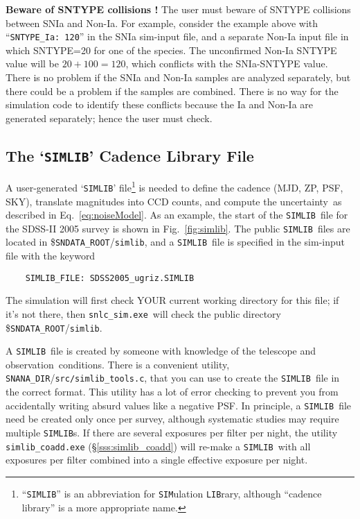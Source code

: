 \documentclass[12pt]{article}
\newcommand{\unc}{uncertainty}
\newcommand{\simexe}{{\tt snlc\_sim.exe}}
\newcommand{\snanadir}{{\tt SNANA\_DIR}}
\newcommand{\sndataroot}{{\tt SNDATA\_ROOT}}
\newcommand{\simlib}{{\tt SIMLIB}}
\newcommand{\obs}{observation}
\begin{document}
{\bigskip
{\bf Beware of SNTYPE collisions !}
The user must beware of SNTYPE collisions between SNIa and Non-Ia.
For example, consider the example above with 
``{\tt SNTYPE\_Ia: 120}'' in the SNIa sim-input file,
and a separate Non-Ia input file in which SNTYPE=20
for one of the species. The unconfirmed Non-Ia SNTYPE
value will be $20+100 = 120$, which conflicts with the
SNIa-SNTYPE value. There is no problem if the SNIa and
Non-Ia samples are analyzed separately, but there could
be a problem if the samples are combined. There is no
way for the simulation code to identify these conflicts because
the Ia and Non-Ia are generated separately; hence the
user must check.


  \clearpage
  \subsection{The `{\simlib}' Cadence Library File }
  \label{subsec:simlib}

A user-generated `{\simlib}' 
file\footnote{``{\simlib}'' is an abbreviation for 
   {\tt SIM}ulation {\tt LIB}rary, although ``cadence library'' 
   is a more appropriate name.}
is needed to define the cadence (MJD, ZP, PSF, SKY), 
translate magnitudes into CCD counts, 
and compute the \unc\ as described in Eq.~\ref{eq:noiseModel}.
%
As an example, the start of the \simlib\ file for the 
SDSS-II 2005 survey is shown in  Fig.~\ref{fig:simlib}.
The public \simlib\ files are located in \$\sndataroot/{\tt simlib},
and a \simlib\ file is specified in the sim-input file with 
the keyword
%
\begin{verbatim}
    SIMLIB_FILE: SDSS2005_ugriz.SIMLIB
\end{verbatim}
%
The simulation will first
check YOUR current working directory for this file; 
if it's not there, then \simexe\ will check the public directory
\$\sndataroot/{\tt simlib}.

A \simlib\ file is created by someone with knowledge of the
telescope and \obs\ conditions. There is a convenient utility, 
\snanadir/{\tt src/simlib\_tools.c}, 
that you can use to create the \simlib\ file in the correct format.
This utility has a lot of error checking to prevent you from
accidentally writing absurd values like a negative PSF.
In principle, a \simlib\ file need be created only once per survey,
although systematic studies may require multiple \simlib s.
If there are several exposures per filter per night,
the utility {\tt simlib\_coadd.exe} (\S\ref{sss:simlib_coadd})
will re-make a \simlib\ with all exposures per filter combined
into a single effective exposure per night.

}
\end{document}
